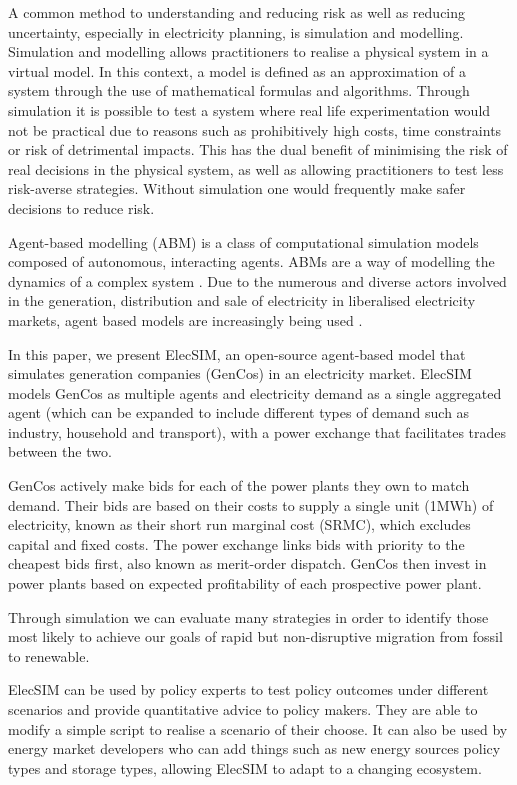 A common method to understanding and reducing risk as well as reducing uncertainty, especially in electricity planning, is simulation and modelling. Simulation and modelling allows practitioners to realise a physical system in a virtual model. In this context, a model is defined as an approximation of a system through the use of mathematical formulas and algorithms. Through simulation it is possible to test a system where real life experimentation would not be practical due to reasons such as prohibitively high costs, time constraints or risk of detrimental impacts. This has the dual benefit of minimising the risk of real decisions in the physical system, as well as allowing practitioners to test less risk-averse strategies. Without simulation one would frequently make safer decisions to reduce risk.

Agent-based modelling (ABM) is a class of computational simulation models composed of autonomous, interacting agents. ABMs are a way of modelling the dynamics of a complex system \cite{MacAl2010}. Due to the numerous and diverse actors involved in the generation, distribution and sale of electricity in liberalised electricity markets, agent based models are increasingly being used \cite{Zhou2007}.

In this paper, we present ElecSIM, an open-source agent-based model that simulates generation companies (GenCos) in an electricity market. ElecSIM models GenCos as multiple agents and electricity demand as a single aggregated agent (which can be expanded to include different types of demand such as industry, household and transport), with a power exchange that facilitates trades between the two. 

GenCos actively make bids for each of the power plants they own to match demand. Their bids are based {\color{red}on their costs to supply a single unit (1MWh) of electricity, known as} their short run marginal cost (SRMC), which excludes capital and fixed costs. The power exchange links bids with priority to the {\color{red}cheapest bids first, also known} as merit-order dispatch. GenCos then invest in power plants based on expected profitability of each prospective power plant.

Through simulation we can evaluate many strategies in order to identify those most likely to achieve our goals of rapid but non-disruptive migration from fossil to renewable.



ElecSIM can be used by policy experts to test policy outcomes under different scenarios and provide quantitative advice to policy makers. They are able to modify a simple script to realise a scenario of their choose. It can also be used by energy market developers who can add things such as new energy sources policy types and storage types, allowing ElecSIM to adapt to a changing ecosystem.






